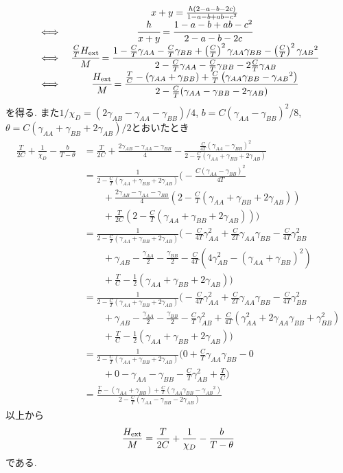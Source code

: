 \documentclass[uplatex,a4j,11pt,dvipdfmx]{jsarticle}
\newcommand{\gaa}{\gamma_{AA}}
\newcommand{\gbb}{\gamma_{BB}}
\newcommand{\gab}{\gamma_{AB}}
\begin{document}
\begin{align}
  \begin{array}{cc}
    &x+y=\frac{h(2-a-b-2c)}{1-a-b+ab-c^2}\\
    \iff&\cfrac{h}{x+y}=\cfrac{1-a-b+ab-c^2}{2-a-b-2c}\\
    \iff&\cfrac{\frac{C}{T}H_{\rm ext}}{M}=\cfrac{1-\frac{C}{T}{\gaa}-\frac{C}{T}{\gbb}+\left(\frac{C}{T}\right)^2{\gaa}{\gbb}-\left(\frac{C}{T}\right)^2{\gab}^2}{2-\frac{C}{T}{\gaa}-\frac{C}{T}{\gbb}-2\frac{C}{T}{\gab}}\\
    \iff&\cfrac{H_{\rm ext}}{M}=\cfrac{\frac{T}{C}-({\gaa}+{\gbb})+\frac{C}{T}\left({\gaa}{\gbb}-{\gab}^2\right)}{2-\frac{C}{T}({\gaa}-{\gbb}-2{\gab})}
  \end{array}
\end{align}
を得る.
また$1/\chi_D=(2{\gab}-{\gaa}-{\gbb})/4$, $b=C({\gaa}-{\gbb})^2/8$, $\theta=C({\gaa}+{\gbb}+2{\gab})/2$とおいたとき
\begin{align}
  \begin{split}
    \frac{T}{2C}+\frac{1}{\chi_D}-\frac{b}{T-\theta}&=\frac{T}{2C}+\frac{2{\gab}-{\gaa}-{\gbb}}{4}-\frac{\frac{C}{4T}({\gaa}-{\gbb})^2}{2-\frac{C}{T}({\gaa}+{\gbb}+2{\gab})}\\
    &=\frac{1}{2-\frac{C}{T}(\gaa+{\gbb}+2{\gab})}\biggl(-\frac{C(\gaa-\gbb)^2}{4T}\\
      &\qquad+\frac{2\gab-\gaa-\gbb}{4}\left(2-\frac{C}{T}(\gaa+\gbb+2\gab)\right)\\
      &\qquad+\frac{T}{2C}\left(2-\frac{C}{T}(\gaa+\gbb+2\gab)\right)\biggr)\\
    &=\frac{1}{2-\frac{C}{T}(\gaa+{\gbb}+2{\gab})}
      \biggl(-\frac{C}{4T}\gaa^2+\frac{C}{2T}\gaa\gbb-\frac{C}{4T}\gbb^2\\
      &\qquad+\gab-\frac{\gaa}{2}-\frac{\gbb}{2}-\frac{C}{4T}\left(4\gab^2-(\gaa+\gbb)^2\right)\\
      &\qquad+\frac{T}{C}-\frac{1}{2}\left(\gaa+\gbb+2\gab\right)\biggr)\\
    &=\frac{1}{2-\frac{C}{T}(\gaa+{\gbb}+2{\gab})}
      \biggl(-\frac{C}{4T}\gaa^2+\frac{C}{2T}\gaa\gbb-\frac{C}{4T}\gbb^2\\
      &\qquad+\gab-\frac{\gaa}{2}-\frac{\gbb}{2}-\frac{C}{T}\gab^2+\frac{C}{4T}\left(\gaa^2+2\gaa\gbb+\gbb^2\right)\\
      &\qquad+\frac{T}{C}-\frac{1}{2}\left(\gaa+\gbb+2\gab\right)\biggr)\\
    &=\frac{1}{2-\frac{C}{T}(\gaa+{\gbb}+2{\gab})}
      \biggl(0+\frac{C}{T}\gaa\gbb-0\\
      &\qquad+0-\gaa-\gbb-\frac{C}{T}\gab^2+\frac{T}{C}\biggr)\\
    &=\frac{\frac{T}{C}-({\gaa}+{\gbb})+\frac{C}{T}\left({\gaa}{\gbb}-{\gab}^2\right)}{2-\frac{C}{T}({\gaa}-{\gbb}-2{\gab})}
  \end{split}
\end{align}
以上から
\begin{align}
  \frac{H_{\rm ext}}{M}=\frac{T}{2C}+\frac{1}{\chi_D}-\frac{b}{T-\theta}
\end{align}
である.
\end{document}
